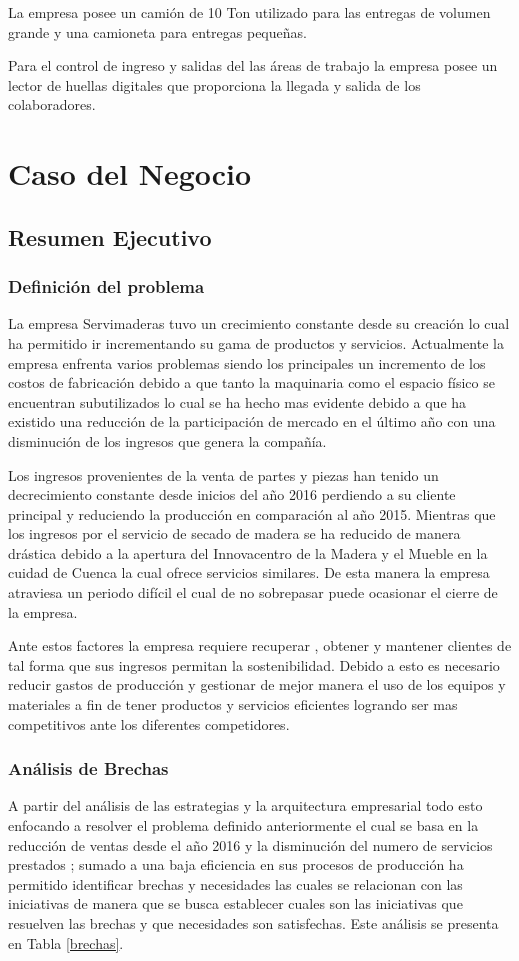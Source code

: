 \documentclass[12pt, a4paper]{article}
\begin{document}
La empresa posee un camión de 10 Ton utilizado para las entregas de volumen grande y una camioneta para entregas pequeñas. 

Para el control de ingreso y salidas del las áreas de trabajo la empresa posee un lector de huellas digitales que proporciona la llegada y salida de los colaboradores.


\newpage
\section{Caso del Negocio}
\subsection{Resumen Ejecutivo}
\subsubsection{Definición del problema}

La empresa Servimaderas tuvo un crecimiento constante desde su creación lo cual ha permitido  ir incrementando su gama de productos y servicios. Actualmente la empresa enfrenta varios problemas siendo los principales un incremento de los costos de fabricación debido a que tanto la maquinaria como el espacio físico se encuentran subutilizados lo cual se ha hecho mas evidente debido a que ha existido una reducción de la participación de mercado en el último año con una disminución de los ingresos que genera la compañía. 

Los ingresos provenientes de la venta de partes y piezas han tenido un decrecimiento constante desde inicios del año 2016 perdiendo a su cliente principal y reduciendo la producción en comparación al año 2015. Mientras que los ingresos por el servicio de secado de madera se ha reducido de manera drástica debido a la apertura del Innovacentro de la Madera y el Mueble en la cuidad de Cuenca la cual ofrece servicios similares. De esta manera la empresa atraviesa un periodo difícil el cual de no sobrepasar puede ocasionar el cierre de la empresa. 

Ante estos factores la empresa requiere recuperar , obtener y mantener clientes de tal forma que sus ingresos permitan la sostenibilidad. Debido a esto es necesario reducir gastos de producción y gestionar de mejor manera el uso de los equipos y materiales a fin de tener productos y servicios eficientes logrando ser mas competitivos ante los diferentes competidores.

\subsubsection{Análisis de Brechas}
A partir del análisis de las estrategias y la arquitectura empresarial todo esto enfocando  a resolver el problema definido anteriormente el cual se basa en la reducción de ventas desde el año 2016 y la disminución del numero de servicios prestados ; sumado a una baja eficiencia en sus procesos de producción  ha permitido  identificar  brechas y necesidades las cuales se relacionan con las iniciativas de manera que se busca establecer cuales son las iniciativas que  resuelven las brechas y que necesidades son satisfechas. Este análisis se presenta en  Tabla \ref{brechas}. 
\end{document}
